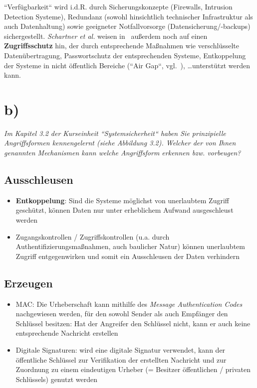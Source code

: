 \noindent
``Verfügbarkeit`` wird i.d.R. durch Sicherungskonzepte (Firewalls, Intrusion Detection Systeme), Redundanz (sowohl hinsichtlich technischer Infrastruktur als auch Datenhaltung) sowie geeigneter Notfallvorsorge (Datensicherung/-backups) sichergestellt.
\textit{Schartner et al.} weisen in~\cite[\textbf{Tab. 3.1}, 24]{ITS1} außerdem noch auf einen \textbf{Zugriffsschutz} hin, der durch entsprechende Maßnahmen wie verschlüsselte Datenübertragung, Passwortschutz der entsprechenden Systeme, Entkoppelung der Systeme in nicht öffentlich Bereiche (``Air Gap``, vgl.~\cite{RFC4949}), \ldots unterstützt werden kann.

\section{b)}

\noindent
\textit{Im Kapitel 3.2 der Kurseinheit ``Systemsicherheit`` haben Sie prinzipielle Angriffsformen kennengelernt (siehe Abbildung 3.2).
Welcher der von Ihnen genannten Mechanismen kann welche Angriffsform erkennen bzw. vorbeugen?
}

\subsection*{Ausschleusen}
\begin{itemize}
    \itemsep0.5em
    \item \textbf{Entkoppelung}: Sind die Systeme möglichst von unerlaubtem Zugriff geschützt, können Daten nur unter erheblichem Aufwand ausgeschleust werden
    \item Zugangskontrollen / Zugriffskontrollen (u.a. durch Authentifizierungsmaßnahmen, auch baulicher Natur) können unerlaubtem Zugriff entgegenwirken und somit ein Ausschleusen der Daten verhindern
\end{itemize}

\subsection*{Erzeugen}
\begin{itemize}
    \itemsep0.5em
    \item {MAC}: Die Urheberschaft kann mithilfe des \textit{Message Authentication Codes} nachgewiesen werden, für den sowohl Sender als auch Empfänger den Schlüssel besitzen: Hat der Angreifer den Schlüssel nicht, kann er auch keine entsprechende Nachricht erstellen
    \item {Digitale Signaturen}: wird eine digitale Signatur verwendet, kann der öffentliche Schlüssel zur Verifikation der erstellten Nachricht und zur Zuordnung zu einem eindeutigen Urheber (= Besitzer öffentlichen / privaten Schlüssels) genutzt werden
\end{itemize}


